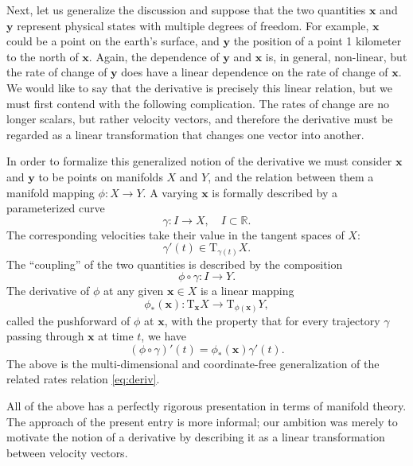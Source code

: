 \documentclass[12pt]{article}
\newcommand{\bx}{\mathbf{x}}
\newcommand{\by}{\mathbf{y}}
\newcommand{\rT}{\mathrm{T}}
\newcommand{\reals}{\mathbb{R}}
\begin{document}
Next, let us generalize the discussion and suppose that the two
quantities $\bx$ and $\by$ represent physical states with multiple
degrees of freedom.  For example, $\bx$ could be a point on the
earth's surface, and $\by$ the position of a point 1 kilometer to the
north of $\bx$.  Again, the dependence of $\by$ and $\bx$ is, in
general, non-linear, but the rate of change of $\by$ does have a
linear dependence on the rate of change of $\bx$.  We would like to
say that the derivative is precisely this linear relation, but we must
first contend with the following complication. The rates of change are
no longer scalars, but rather velocity vectors, and therefore the
derivative must be regarded as a linear transformation that changes
one vector into another.

In order to formalize this generalized notion of the derivative we
must consider $\bx$ and $\by$ to be points on manifolds $X$ and $Y$,
and the relation between them a manifold mapping $\phi:X\rightarrow
Y$.  A varying $\bx$ is formally described by a parameterized curve
$$\gamma:I\rightarrow X,\quad I\subset\reals.$$
The corresponding
velocities take their value in the tangent spaces of $X$:
$$\gamma'(t) \in \rT_{\gamma(t)} X.$$
The ``coupling'' of the two quantities is described by the composition
$$\phi\circ\gamma:I\rightarrow Y.$$
The derivative of $\phi$ at any given $\bx\in X$ is a linear mapping
$$\phi_*(\bx): \rT_{\bx} X \rightarrow \rT_{\phi(\bx)} Y,$$
called the
pushforward of $\phi$ at $\bx$, with the property that for every
trajectory $\gamma$ passing through $\bx$ at time $t$, we have
$$(\phi\circ\gamma)'(t) = \phi_*(\bx)\gamma'(t).$$
The above is the multi-dimensional and coordinate-free generalization
of the related rates relation \eqref{eq:deriv}.

All of the above has a perfectly rigorous presentation in terms of
manifold theory.  The approach of the present entry is more informal;
our ambition was merely to motivate the notion of a derivative by
describing it as a linear transformation between velocity vectors.
\end{document}
